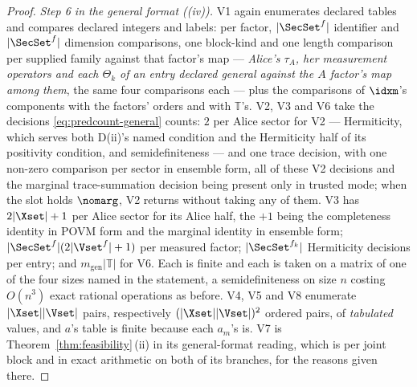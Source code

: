 \begin{proof}
\emph{Step 6 in the general format ((iv)).} V1 again enumerates declared
tables and compares declared integers and labels: per factor,
$|\SecSet^{f}|$ identifier and $|\SecSet^{f}|$ dimension comparisons, one
block-kind and one length comparison per supplied family against that
factor's map --- \emph{Alice's $\tau_A$, her measurement operators and each
$\Theta_k$ of an entry declared general against the $A$ factor's map among
them}, the same four comparisons each --- plus the comparisons of $\idxm$'s
components with the factors' orders and with $\mathbb{T}$'s. V2, V3 and V6
take the decisions \eqref{eq:predcount-general} counts: $2$ per Alice sector
for V2 --- Hermiticity, which serves both D(ii)'s named condition and the
Hermiticity half of its positivity condition, and semidefiniteness --- and one
trace decision, with one non-zero comparison per sector in ensemble form, all
of these V2 decisions and the marginal trace-summation decision being present
only in trusted mode; when the slot holds $\nomarg$, V2 returns without taking
any of them. V3 has $2|\Xset|+1$ per Alice sector for its Alice half, the
$+1$ being the completeness identity in POVM form and the marginal identity
in ensemble form; $|\SecSet^{f}|(2|\Vset^{f}|+1)$ per measured factor;
$|\SecSet^{f_k}|$ Hermiticity decisions per entry; and
$m_{\text{gen}}|\mathbb{T}|$ for V6. Each is finite and each is taken on a
matrix of one of the four sizes named in the statement, a semidefiniteness on
size $n$ costing $O(n^3)$ exact rational operations as before. V4, V5 and V8
enumerate $|\Xset||\Vset|$ pairs, respectively $(|\Xset||\Vset|)^2$ ordered
pairs, of \emph{tabulated} values, and $a$'s table is finite because each
$a_m$'s is. V7 is Theorem~\ref{thm:feasibility}\,(ii) in its general-format reading,
which is per joint block and in exact arithmetic on both of its branches, for
the reasons given there.
\end{proof}
